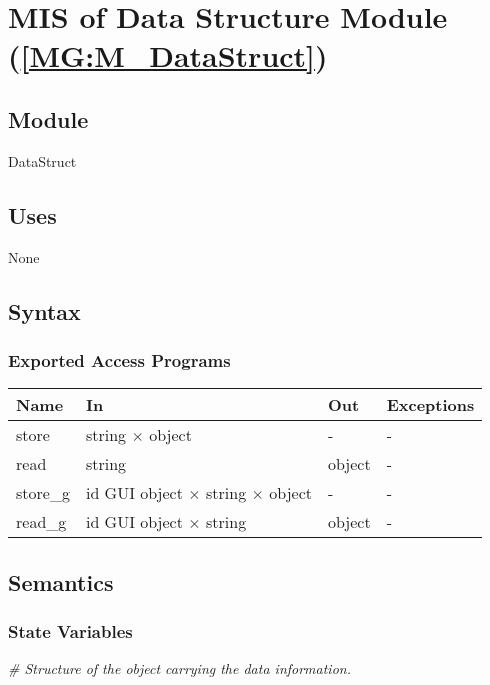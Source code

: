 \documentclass[12pt, titlepage]{article}
\begin{document}
\section{MIS of Data Structure Module 
(\texorpdfstring{\cref{MG:M_DataStruct}}))} \label{MIS_DataStruct}

\subsection{Module}
DataStruct
\subsection{Uses}
None
\subsection{Syntax}

\subsubsection{Exported Access Programs}

\begin{center}
\begin{tabular}{p{3cm} p{4cm} p{3cm} p{3cm}}
\hline
\textbf{Name} & \textbf{In} & \textbf{Out} & \textbf{Exceptions} \\
\hline
store & string $\times$ object & - & - \\
read & string & object & - \\
store{\_}g & id GUI object $\times$ string $\times$ object & - & - \\
read{\_}g & id GUI object $\times$ string & object & - \\
\hline
\end{tabular}
\end{center}

\subsection{Semantics}

\subsubsection{State Variables}

\noindent\textit{{\#} Structure of the object carrying the data 
information.}\medskip
\end{document}

